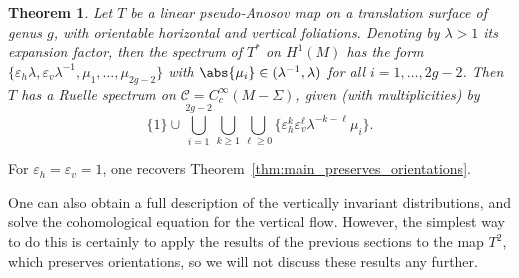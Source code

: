 \documentclass[10pt]{amsart}
\newcommand{\boC}{\mathcal{C}}
\let\epsilon\varepsilon
\newtheorem{thm}{Theorem}[section]
\theoremstyle{definition}
\numberwithin{equation}{section}
\begin{document}
\begin{thm}
\label{thm:orientable_not_preserved_foliations} Let $T$ be a linear
pseudo-Anosov map on a translation surface of genus $g$, with orientable
horizontal and vertical foliations. Denoting by $\lambda
> 1$ its expansion factor, then the spectrum of $T^*$ on $H^1(M)$ has the
form $\{\epsilon_h \lambda, \epsilon_v
\lambda^{-1},\mu_1,\dotsc,\mu_{2g-2}\}$ with $\abs{\mu_i} \in
(\lambda^{-1},\lambda)$ for all $i=1,\dotsc, 2g-2$. Then $T$ has a Ruelle
spectrum on $\boC = C^\infty_c(M-\Sigma)$, given (with multiplicities) by
\begin{equation*}
\{1\} \cup \bigcup_{i=1}^{2g-2} \bigcup_{k \geq 1} \bigcup_{\ell \geq 0} \{\epsilon_h^k \epsilon_v^\ell \lambda^{-k-\ell}\mu_i\}.
\end{equation*}
\end{thm}
For $\epsilon_h=\epsilon_v=1$, one recovers
Theorem~\ref{thm:main_preserves_orientations}.

One can also obtain a full description of the vertically invariant
distributions, and solve the cohomological equation for the vertical flow.
However, the simplest way to do this is certainly to apply the results of the
previous sections to the map $T^2$, which preserves orientations, so we will
not discuss these results any further.
\end{document}
